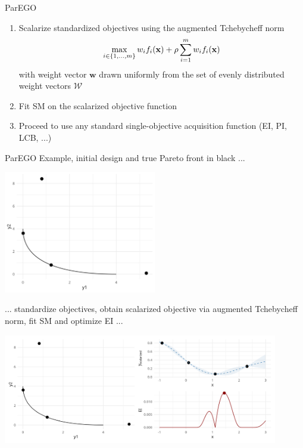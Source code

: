 \documentclass[11pt,compress,t,notes=noshow, xcolor=table]{beamer}
\begin{document}
\begin{vbframe}{ParEGO}

 \begin{enumerate}
   \item Scalarize standardized objectives using the augmented Tchebycheff norm
   \begin{equation*}
   \label{eq:tcheby}
     \max\limits_{i \in \{1, \ldots, m\}} w_i f_i(\mathbf{x}) + \rho \sum\limits_{i = 1}^m w_i f_i(\mathbf{x})
   \end{equation*}
   with weight vector $\mathbf{w}$ drawn uniformly from the set of evenly distributed weight vectors $\mathcal{W}$
   \item Fit SM on the scalarized objective function
   \item Proceed to use any standard single-objective acquisition function (EI, PI, LCB, ...)
 \end{enumerate}

\framebreak
ParEGO Example, initial design and true Pareto front in black ...
\vspace{1cm}
\begin{center}
  \includegraphics[width = 0.5\textwidth]{figure_man/multicrit_1.png}
\end{center}

\framebreak
... standardize objectives, obtain scalarized objective via augmented Tchebycheff norm, fit SM and optimize EI ...
\vspace{+0.45cm}
\begin{center}
  \includegraphics[width = 0.9\textwidth]{figure_man/multicrit_2.png}
\end{center}


\end{vbframe}
\end{document}
